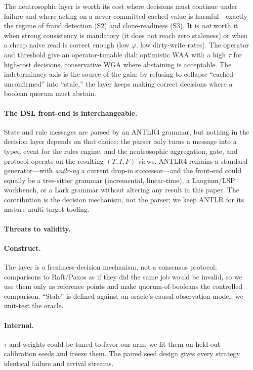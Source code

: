 \documentclass[11pt]{article}
\begin{document}
The neutrosophic layer is worth its cost where decisions must continue under failure and where acting
on a never-committed cached value is harmful---exactly the regime of fraud detection (S2) and
clone-readiness (S3). It is \emph{not} worth it when strong consistency is mandatory (it does not reach
zero staleness) or when a cheap naive read is correct enough (low $\varphi$, low dirty-write rates).
The operator and threshold give an operator-tunable dial: optimistic WAA with a high $\tau$ for
high-cost decisions, conservative WGA where abstaining is acceptable. The indeterminacy axis is the
source of the gain: by refusing to collapse ``cached-unconfirmed'' into ``stale,'' the layer keeps
making correct decisions where a boolean quorum must abstain.

\paragraph{The DSL front-end is interchangeable.} State and rule messages are parsed by an ANTLR4
grammar, but nothing in the decision layer depends on that choice: the parser only turns a message into
a typed event for the rules engine, and the neutrosophic aggregation, gate, and protocol operate on the
resulting $(T,I,F)$ views. ANTLR4 remains a standard generator---with \emph{antlr-ng} a current drop-in
successor---and the front-end could equally be a tree-sitter grammar (incremental, linear-time), a
Langium/LSP workbench, or a Lark grammar without altering any result in this paper. The contribution is
the decision mechanism, not the parser; we keep ANTLR for its mature multi-target tooling.

\paragraph{Threats to validity.}
\label{sec:threats}

\paragraph{Construct.} The layer is a freshness-decision mechanism, not a consensus protocol;
comparisons to Raft/Paxos as if they did the same job would be invalid, so we use them only as
reference points and make quorum-of-booleans the controlled comparison. ``Stale'' is defined against an
oracle's causal-observation model; we unit-test the oracle.

\paragraph{Internal.} $\tau$ and weights could be tuned to favor our arm; we fit them on held-out
calibration seeds and freeze them. The paired seed design gives every strategy identical failure and
arrival streams.
\end{document}
